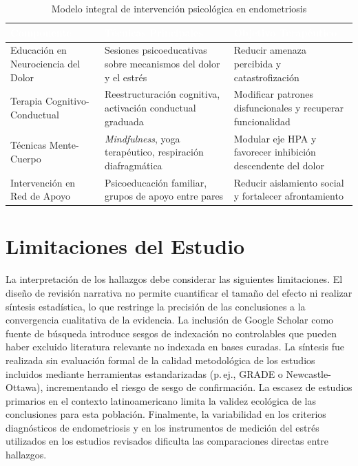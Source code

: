 \documentclass[12pt, a4paper]{article}
\renewcommand{\arraystretch}{1.4}
\begin{document}
\begin{table}[ht]
\centering
\caption{Modelo integral de intervención psicológica en endometriosis}
\label{tab:intervencion}
\small
\renewcommand{\arraystretch}{1.5}
\begin{tabularx}{\textwidth}{
  >{\raggedright\arraybackslash}p{3.4cm}
  >{\raggedright\arraybackslash}X
  >{\raggedright\arraybackslash}p{4.2cm}
}
\toprule
\rowcolor{darkblue}
\textcolor{white}{\textbf{Componente}} &
\textcolor{white}{\textbf{Técnicas Principales}} &
\textcolor{white}{\textbf{Objetivo Terapéutico}} \\
\midrule
\rowcolor{rowA}
Educación en Neurociencia del Dolor &
Sesiones psicoeducativas sobre mecanismos del dolor y el estrés &
Reducir amenaza percibida y catastrofización \\

\rowcolor{rowB}
Terapia Cognitivo-Conductual &
Reestructuración cognitiva, activación conductual graduada &
Modificar patrones disfuncionales y recuperar funcionalidad \\

\rowcolor{rowA}
Técnicas Mente-Cuerpo &
\textit{Mindfulness}, yoga terapéutico, respiración diafragmática &
Modular eje HPA y favorecer inhibición descendente del dolor \\

\rowcolor{rowB}
Intervención en Red de Apoyo &
Psicoeducación familiar, grupos de apoyo entre pares &
Reducir aislamiento social y fortalecer afrontamiento \\
\bottomrule
\end{tabularx}
\end{table}

\section{Limitaciones del Estudio}

La interpretación de los hallazgos debe considerar las siguientes limitaciones. El diseño
de revisión narrativa no permite cuantificar el tamaño del efecto ni realizar síntesis
estadística, lo que restringe la precisión de las conclusiones a la convergencia cualitativa
de la evidencia. La inclusión de Google Scholar como fuente de búsqueda introduce sesgos de
indexación no controlables que pueden haber excluido literatura relevante no indexada en
bases curadas. La síntesis fue realizada sin evaluación formal de la calidad metodológica de
los estudios incluidos mediante herramientas estandarizadas (p.\,ej., GRADE o
Newcastle-Ottawa), incrementando el riesgo de sesgo de confirmación. La escasez de estudios
primarios en el contexto latinoamericano limita la validez ecológica de las conclusiones para
esta población. Finalmente, la variabilidad en los criterios diagnósticos de endometriosis y
en los instrumentos de medición del estrés utilizados en los estudios revisados dificulta
las comparaciones directas entre hallazgos.
\end{document}
